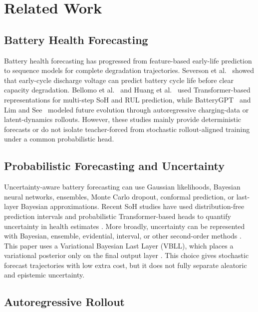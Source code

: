 \documentclass[conference]{IEEEtran}
\begin{document}
\section{Related Work}

\subsection{Battery Health Forecasting}

Battery health forecasting has progressed from feature-based early-life
prediction to sequence models for complete degradation trajectories. Severson
et al.~\cite{severson2019} showed that early-cycle discharge voltage can predict
battery cycle life before clear capacity degradation. Bellomo
et al.~\cite{bellomo2025transformersoh} and Huang et al.~\cite{huang2026ic2ml}
used Transformer-based representations for multi-step SoH and RUL prediction,
while BatteryGPT~\cite{hu2025batterygpt} and Lim and
See~\cite{lim2026worldmodel} modeled future evolution through autoregressive
charging-data or latent-dynamics rollouts. However, these studies mainly
provide deterministic forecasts or do not isolate teacher-forced from
stochastic rollout-aligned training under a common probabilistic head.

\subsection{Probabilistic Forecasting and Uncertainty}

Uncertainty-aware battery forecasting can use Gaussian likelihoods, Bayesian
neural networks, ensembles, Monte Carlo dropout, conformal prediction, or
last-layer Bayesian approximations. Recent SoH studies have used
distribution-free prediction intervals and probabilistic Transformer-based heads to
quantify uncertainty in health estimates
\cite{rasul2026ensemble,munna2026fusion}.
More broadly, uncertainty can be represented with Bayesian, ensemble,
evidential, interval, or other second-order methods
\cite{wang2026uqreview}. This paper uses a Variational Bayesian Last Layer
(VBLL), which places a variational posterior only on the final output layer
\cite{harrison2024vbll}. This choice gives stochastic forecast trajectories
with low extra cost, but it does not fully separate aleatoric and epistemic
uncertainty.

\subsection{Autoregressive Rollout}
\end{document}
